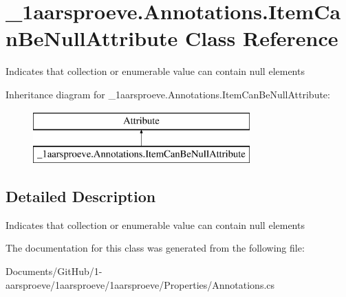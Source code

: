 \hypertarget{class__1aarsproeve_1_1_annotations_1_1_item_can_be_null_attribute}{}\section{\+\_\+1aarsproeve.\+Annotations.\+Item\+Can\+Be\+Null\+Attribute Class Reference}
\label{class__1aarsproeve_1_1_annotations_1_1_item_can_be_null_attribute}


Indicates that collection or enumerable value can contain null elements  


Inheritance diagram for \+\_\+1aarsproeve.\+Annotations.\+Item\+Can\+Be\+Null\+Attribute\+:\begin{figure}[H]
\begin{center}
\leavevmode
\includegraphics[height=2.000000cm]{class__1aarsproeve_1_1_annotations_1_1_item_can_be_null_attribute}
\end{center}
\end{figure}


\subsection{Detailed Description}
Indicates that collection or enumerable value can contain null elements 



The documentation for this class was generated from the following file\+:\begin{DoxyCompactItemize}
\item 
Documents/\+Git\+Hub/1-\/aarsproeve/1aarsproeve/1aarsproeve/\+Properties/Annotations.\+cs\end{DoxyCompactItemize}
